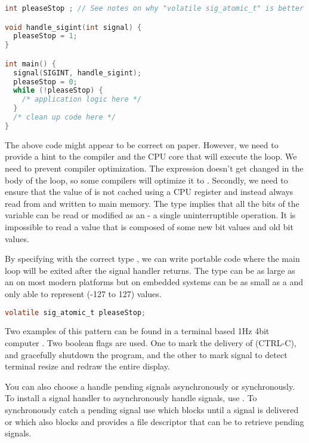 \begin{lstlisting}[language=C]
int pleaseStop ; // See notes on why "volatile sig_atomic_t" is better

void handle_sigint(int signal) {
  pleaseStop = 1;
}

int main() {
  signal(SIGINT, handle_sigint);
  pleaseStop = 0;
  while (!pleaseStop) {
    /* application logic here */
  }
  /* clean up code here */
}
\end{lstlisting}

The above code might appear to be correct on paper.
However, we need to provide a hint to the compiler and the CPU core that will execute the  loop.
We need to prevent compiler optimization.
The expression  doesn't get changed in the body of the loop, so some compilers will optimize it to  .
Secondly, we need to ensure that the value of  is not cached using a CPU register and instead always read from and written to main memory.
The  type implies that all the bits of the variable can be read or modified as an  - a single uninterruptible operation.
It is impossible to read a value that is composed of some new bit values and old bit values.

By specifying  with the correct type , we can write portable code where the main loop will be exited after the signal handler returns.
The  type can be as large as an  on most modern platforms but on embedded systems can be as small as a  and only able to represent (-127 to 127) values.

\begin{lstlisting}[language=C]
volatile sig_atomic_t pleaseStop;
\end{lstlisting}

Two examples of this pattern can be found in  a terminal based 1Hz 4bit computer \cite{Sorn_2015}.
Two boolean flags are used.
One to mark the delivery of  (CTRL-C), and gracefully shutdown the program, and the other to mark  signal to detect terminal resize and redraw the entire display.

You can also choose a handle pending signals asynchronously or synchronously.
To install a signal handler to asynchronously handle signals, use .
To synchronously catch a pending signal use  which blocks until a signal is delivered or  which also blocks and provides a file descriptor that can be  to retrieve pending signals.

